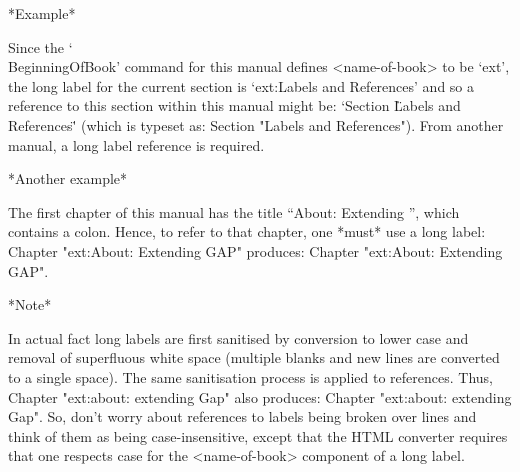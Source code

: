 *Example*

Since  the  `\\BeginningOfBook'   command   for   this   manual   defines
<name-of-book> to be `ext', the long label for  the  current  section  is
`ext:Labels and References' and so a reference  to  this  section  within
this manual might be:  `Section  \"Labels  and  References\"'  (which  is
typeset as: Section "Labels and References"). From another manual, a long
label reference is required.

*Another example*

The first chapter of this manual has the title ``About: Extending {\GAP}'',
which contains a colon. Hence, to refer to that chapter, one *must* use a
long label: 
\begintt
Chapter "ext:About: Extending GAP"
\endtt
produces: Chapter "ext:About: Extending GAP".

*Note*

In actual fact long labels are first sanitised by conversion to lower case
and removal of superfluous white space (multiple blanks and new lines are
converted to a single space). The same sanitisation process is applied to
references. Thus, 
\begintt
Chapter "ext:about:                                             extending
Gap"
\endtt
also produces: 
Chapter "ext:about:                                             extending
Gap". So, don't worry about references to labels being broken over  lines
and think of  them  as  being  case-insensitive,  except  that  the  HTML
converter  requires  that  one  respects  case  for  the   <name-of-book>
component of a long label.



